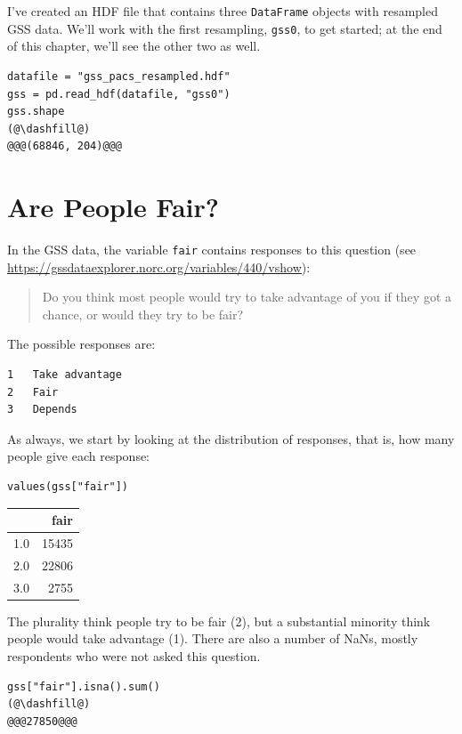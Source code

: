 I've created an HDF file that contains three
\passthrough{\lstinline!DataFrame!} objects with resampled GSS data.
We'll work with the first resampling, \passthrough{\lstinline!gss0!}, to
get started; at the end of this chapter, we'll see the other two as
well.

\begin{lstlisting}[]
datafile = "gss_pacs_resampled.hdf"
gss = pd.read_hdf(datafile, "gss0")
gss.shape
(@\dashfill@)
@@@(68846, 204)@@@
\end{lstlisting}

\hypertarget{are-people-fair}{%
\section{Are People Fair?}\label{are-people-fair}}

In the GSS data, the variable \passthrough{\lstinline!fair!} contains
responses to this question (see
\url{https://gssdataexplorer.norc.org/variables/440/vshow}):

\begin{quote}
Do you think most people would try to take advantage of you if they got
a chance, or would they try to be fair?
\end{quote}

The possible responses are:

\begin{lstlisting}
1   Take advantage
2   Fair
3   Depends
\end{lstlisting}

As always, we start by looking at the distribution of responses, that
is, how many people give each response:

\begin{lstlisting}[]
values(gss["fair"])
\end{lstlisting}

\begin{tabular}{lr}
\midrule
{} &   fair \\
\midrule
1.0 &  15435 \\
2.0 &  22806 \\
3.0 &   2755 \\
\midrule
\end{tabular}

The plurality think people try to be fair (2), but a substantial
minority think people would take advantage (1). There are also a number
of NaNs, mostly respondents who were not asked this question.

\begin{lstlisting}[]
gss["fair"].isna().sum()
(@\dashfill@)
@@@27850@@@
\end{lstlisting}

